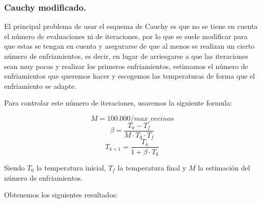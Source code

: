 \documentclass[12pt, spanish]{article}
\begin{document}
\newpage

\subsubsection{Cauchy modificado.}

El principal problema de usar el esquema de Cauchy es que no se tiene en cuenta el número de evaluaciones ni de iteraciones, por lo que se suele modificar para que estas se tengan en cuenta y asegurarse de que al menos se realizan un cierto número de enfriamientos, es decir, en lugar de arriesgarse a que las iteraciones sean muy pocas y realizar los primeros enfriamientos, estimamos el número de enfriamientos que queremos hacer y escogemos las temperaturas de forma que el enfriamiento se adapte.

Para controlar este número de iteraciones, usaremos la siguiente formula:

$$ M = 100.000/max\_vecinos $$
$$ \beta = \frac{T_0 - T_f}{M \cdot T_0 \cdot T_f} $$
$$ T_{k+1} = \frac{T_k}{1 + \beta \cdot T_k} $$

Siendo $T_0$ la temperatura inicial, $T_f$ la temperatura final y $M$ la estimación del número de enfriamientos. 

Obtenemos los siguientes resultados:
\end{document}
